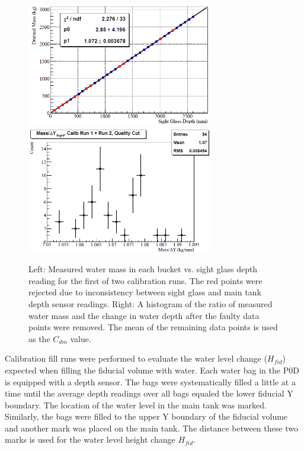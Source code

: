 \begin{figure}
\centering
\includegraphics[width=3.2in]{Figures/cdmline.png}
\includegraphics[width=3.2in]{Figures/cdmhist.png}
\caption{Left: Measured water mass in each bucket vs. sight glass depth reading for the first of two calibration runs. The red points were rejected due to inconsistency between sight glass and main tank depth sensor readings. Right: A histogram of the ratio of measured water mass and the change in water depth after the faulty data points were removed. The mean of the remaining data points is used as the $C_{dm}$ value.}
\label{fig:cdm}
\end{figure}

Calibration fill runs were performed to evaluate the water level change ($H_{fid}$) expected when filling the fiducial volume with water. Each water bag in the P0D is equipped with a depth sensor. The bags were systematically filled a little at a time until the average depth readings over all bags equaled the lower fiducial Y boundary. The location of the water level in the main tank was marked. Similarly, the bags were filled to the upper Y boundary of the fiducial volume and another mark was placed on the main tank. The distance between these two marks is used for the water level height change $H_{fid}$. 


